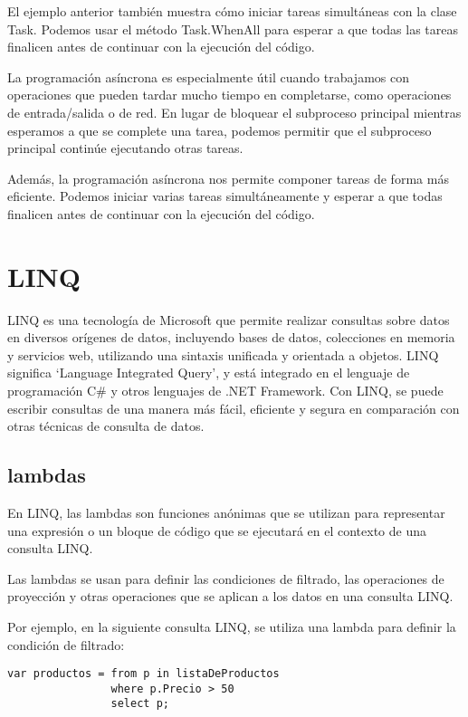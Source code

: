 \documentclass[executivepaper]{article}
\begin{document}
El ejemplo anterior también muestra cómo iniciar tareas simultáneas con la clase Task. Podemos usar el método Task.WhenAll para esperar a que todas las tareas finalicen antes de continuar con la ejecución del código.

La programación asíncrona es especialmente útil cuando trabajamos con operaciones que pueden tardar mucho tiempo en completarse, como operaciones de entrada/salida o de red. En lugar de bloquear el subproceso principal mientras esperamos a que se complete una tarea, podemos permitir que el subproceso principal continúe ejecutando otras tareas.

Además, la programación asíncrona nos permite componer tareas de forma más eficiente. Podemos iniciar varias tareas simultáneamente y esperar a que todas finalicen antes de continuar con la ejecución del código.

\newpage
\section{LINQ}

LINQ es una tecnología de Microsoft que permite realizar consultas sobre datos en diversos orígenes de datos, incluyendo bases de datos, colecciones en memoria y servicios web, utilizando una sintaxis unificada y orientada a objetos. LINQ significa \enquote*{Language Integrated Query}, y está integrado en el lenguaje de programación C\# y otros lenguajes de .NET Framework. Con LINQ, se puede escribir consultas de una manera más fácil, eficiente y segura en comparación con otras técnicas de consulta de datos.

\subsection*{lambdas}

En LINQ, las lambdas son funciones anónimas que se utilizan para representar una expresión o un bloque de código que se ejecutará en el contexto de una consulta LINQ.

Las lambdas se usan para definir las condiciones de filtrado, las operaciones de proyección y otras operaciones que se aplican a los datos en una consulta LINQ.

Por ejemplo, en la siguiente consulta LINQ, se utiliza una lambda para definir la condición de filtrado:

\begin{lstlisting}
var productos = from p in listaDeProductos
                where p.Precio > 50
                select p;
\end{lstlisting}
\end{document}
